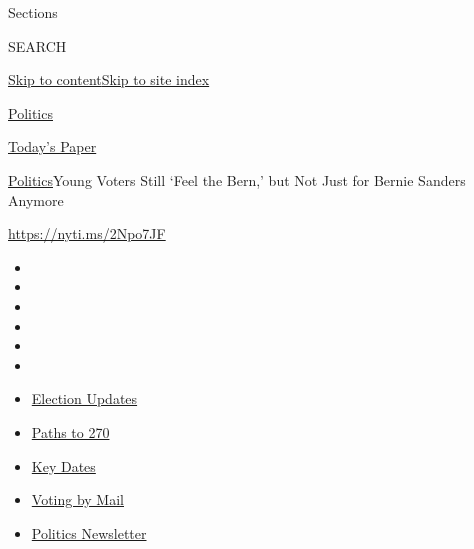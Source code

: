 Sections

SEARCH

\protect\hyperlink{site-content}{Skip to
content}\protect\hyperlink{site-index}{Skip to site index}

\href{https://www.nytimes3xbfgragh.onion/section/politics}{Politics}

\href{https://myaccount.nytimes3xbfgragh.onion/auth/login?response_type=cookie\&client_id=vi}{}

\href{https://www.nytimes3xbfgragh.onion/section/todayspaper}{Today's
Paper}

\href{/section/politics}{Politics}\textbar{}Young Voters Still `Feel the
Bern,' but Not Just for Bernie Sanders Anymore

\url{https://nyti.ms/2Npo7JF}

\begin{itemize}
\item
\item
\item
\item
\item
\item
\end{itemize}

\begin{itemize}
\item
  \href{https://www.nytimes3xbfgragh.onion/live/2020/09/11/us/trump-vs-biden?action=click\&pgtype=Article\&state=default\&region=TOP_BANNER\&context=storylines_menu}{Election
  Updates}
\item
  \href{https://www.nytimes3xbfgragh.onion/interactive/2020/us/elections/election-states-biden-trump.html?action=click\&pgtype=Article\&state=default\&region=TOP_BANNER\&context=storylines_menu}{Paths
  to 270}
\item
  \href{https://www.nytimes3xbfgragh.onion/interactive/2019/us/elections/2020-presidential-election-calendar.html?action=click\&pgtype=Article\&state=default\&region=TOP_BANNER\&context=storylines_menu}{Key
  Dates}
\item
  \href{https://www.nytimes3xbfgragh.onion/interactive/2020/08/31/us/politics/vote-by-mail-deadlines.html?action=click\&pgtype=Article\&state=default\&region=TOP_BANNER\&context=storylines_menu}{Voting
  by Mail}
\item
  \href{https://www.nytimes3xbfgragh.onion/newsletters/politics?action=click\&pgtype=Article\&state=default\&region=TOP_BANNER\&context=storylines_menu}{Politics
  Newsletter}
\end{itemize}

